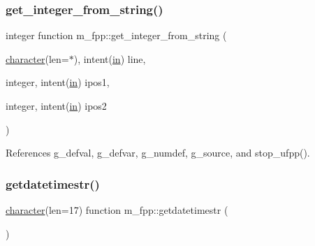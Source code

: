 \subsubsection{\texorpdfstring{get\+\_\+integer\+\_\+from\+\_\+string()}{get\_integer\_from\_string()}}
{\footnotesize\ttfamily integer function m\+\_\+fpp\+::get\+\_\+integer\+\_\+from\+\_\+string (\begin{DoxyParamCaption}\item[{\hyperlink{option__stopwatch_83_8txt_abd4b21fbbd175834027b5224bfe97e66}{character}(len=$\ast$), intent(\hyperlink{M__journal_83_8txt_afce72651d1eed785a2132bee863b2f38}{in})}]{line,  }\item[{integer, intent(\hyperlink{M__journal_83_8txt_afce72651d1eed785a2132bee863b2f38}{in})}]{ipos1,  }\item[{integer, intent(\hyperlink{M__journal_83_8txt_afce72651d1eed785a2132bee863b2f38}{in})}]{ipos2 }\end{DoxyParamCaption})}



References g\+\_\+defval, g\+\_\+defvar, g\+\_\+numdef, g\+\_\+source, and stop\+\_\+ufpp().

\mbox{\label{namespacem__fpp_aa52b30ff734a7831d3334aee5ef4e8e7}} 
\subsubsection{\texorpdfstring{getdatetimestr()}{getdatetimestr()}}
{\footnotesize\ttfamily \hyperlink{option__stopwatch_83_8txt_abd4b21fbbd175834027b5224bfe97e66}{character}(len=17) function m\+\_\+fpp\+::getdatetimestr (\begin{DoxyParamCaption}{ }\end{DoxyParamCaption})}

\mbox{\label{namespacem__fpp_a77ebcaafb7e1396c68dbc0bdcc088232}} 
